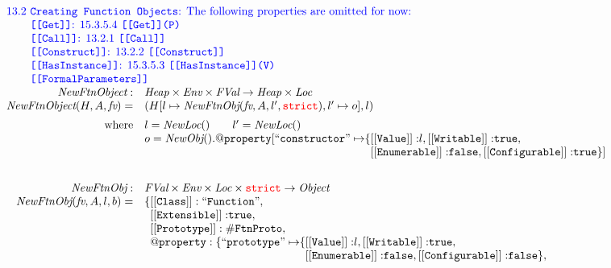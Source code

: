\documentclass[a4paper, leqno]{amsart}
\newcommand{\rulesep}{\quad\quad}
\def\inred{\color{red}}
\def\inblue{\color{blue}}
\newcommand{\strict}{{\inred\tt strict}}
\newcommand{\false}{{\tt false}}
\newcommand{\true}{{\tt true}}
\newcommand{\FVal}{\emph{FVal}}
\newcommand{\Loc}{\emph{Loc}}
\newcommand{\Obj}{\emph{Object}}
\newcommand{\Heap}{\emph{Heap}}
\newcommand{\Env}{\emph{Env}}
\newcommand{\hf}[1]{\emph{#1}}
\def\inred{\color{red}}
\def\inblue{\color{blue}}
\begin{document}
\[
\begin{array}{rl}
\multicolumn{2}{l}{\mbox{\inblue 13.2 {\tt Creating Function Objects}: The following properties are omitted for now:}}\\
\multicolumn{2}{l}{\mbox{\inblue \phantom{13.2} {\tt [[Get]]}: 15.3.5.4 {\tt [[Get]](P)}}}\\
\multicolumn{2}{l}{\mbox{\inblue \phantom{13.2} {\tt [[Call]]}: 13.2.1 {\tt [[Call]]}}}\\
\multicolumn{2}{l}{\mbox{\inblue \phantom{13.2} {\tt [[Construct]]}: 13.2.2 {\tt [[Construct]]}}}\\
\multicolumn{2}{l}{\mbox{\inblue \phantom{13.2} {\tt [[HasInstance]]}: 15.3.5.3 {\tt [[HasInstance]](V)}}}\\
\multicolumn{2}{l}{\mbox{\inblue \phantom{13.2} {\tt [[FormalParameters]]}}}\\

\hf{NewFtnObject}: & \Heap \times \Env \times \FVal \rightarrow \Heap \times \Loc\\
\hf{NewFtnObject}(H,A,\emph{fv})=&
(H[l\mapsto\hf{NewFtnObj}(\emph{fv},A,l',\strict), l'\mapsto o], l)
\\[.5em]
\mbox{where} &
l = \hf{NewLoc}()
\rulesep
l' = \hf{NewLoc}()
\\
&
o = \hf{NewObj}().{\tt @property}[{\tt``constructor"\mapsto}\{{\tt [[Value]]:}l,%
 {\tt [[Writable]]:} \true,\\
&\phantom{o = \hf{NewObj}().{\tt @property}[{\tt``constructor"\mapsto}\{}%
 {\tt [[Enumerable]]:} \false,
 {\tt [[Configurable]]:} \true\}]

\\[2em]




\hf{NewFtnObj} :& \FVal \times \Env \times \Loc \times \strict \rightarrow \Obj \\
\hf{NewFtnObj}(\emph{fv},A,l,b) =&
{\tt \{[[Class]]: ``Function"}, \\%
& \phantom{\{}
{\tt [[Extensible]]:} \true,\\
& \phantom{\{}{\tt [[Prototype]]: \#FtnProto},\\
& \phantom{\{}{\tt @property: \{``prototype"\mapsto}\{{\tt [[Value]]:}l,
 {\tt [[Writable]]:} \true,\\%
& \phantom{\{{\tt @property: \{``prototype"\mapsto}\{}%
 {\tt [[Enumerable]]:} \false,
 {\tt [[Configurable]]:} \false\}, \\


\end{array}\]
\end{document}
